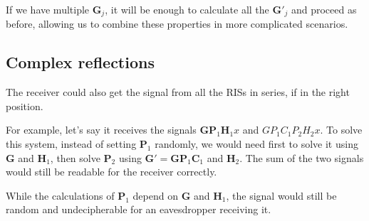 If we have multiple $\bm{G}_j$, it will be enough to calculate all the $\bm{G}'_j$ and proceed as before, allowing us to combine these properties in more complicated scenarios.

\subsection{Complex reflections}

The receiver could also get the signal from all the RISs in series, if in the right position.

For example, let's say it receives the signals $\bm{GP}_1\bm{H}_1x$ and $GP_1C_1P_2H_2x$. To solve this system, instead of setting $\bm{P}_1$ randomly, we would need first to solve it using $\bm{G}$ and $\bm{H}_1$, then solve $\bm{P}_2$ using $\bm{G}'=\bm{GP}_1\bm{C}_1$ and $\bm{H}_2$. The sum of the two signals would still be readable for the receiver correctly.

While the calculations of $\bm{P}_1$ depend on $\bm{G}$ and $\bm{H}_1$, the signal would still be random and undecipherable for an eavesdropper receiving it.
